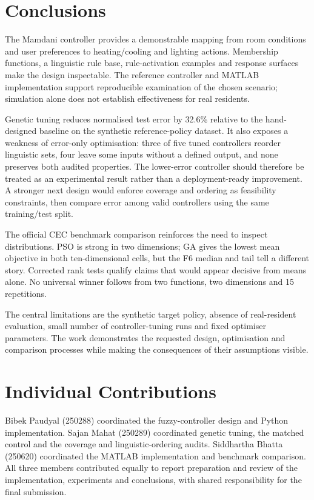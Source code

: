 \section{Conclusions}
\label{sec:t2-conclusion}
The Mamdani controller provides a demonstrable mapping from room conditions and user
preferences to heating/cooling and lighting actions. Membership functions, a linguistic rule
base, rule-activation examples and response surfaces make the design inspectable. The
reference controller and MATLAB implementation support reproducible examination of the
chosen scenario; simulation alone does not establish effectiveness for real residents.

Genetic tuning reduces normalised test error by 32.6\% relative to the hand-designed baseline
on the synthetic reference-policy dataset. It also exposes a weakness of error-only optimisation:
three of five tuned controllers reorder linguistic sets, four leave some inputs without a defined
output, and none preserves both audited properties. The lower-error controller should therefore
be treated as an experimental result rather than a deployment-ready improvement. A stronger
next design would enforce coverage and ordering as feasibility constraints, then compare error
among valid controllers using the same training/test split.

The official CEC benchmark comparison reinforces the need to inspect distributions. PSO is
strong in two dimensions; GA gives the lowest mean objective in both ten-dimensional cells,
but the F6 median and tail tell a different story. Corrected rank tests qualify claims that
would appear decisive from means alone. No universal winner follows from two functions,
two dimensions and 15 repetitions.

The central limitations are the synthetic target policy, absence of real-resident evaluation,
small number of controller-tuning runs and fixed optimiser parameters. The work demonstrates
the requested design, optimisation and comparison processes while making the consequences
of their assumptions visible.

\section*{Individual Contributions}
Bibek Paudyal (250288) coordinated the fuzzy-controller design and Python implementation.
Sajan Mahat (250289) coordinated genetic tuning, the matched control and the coverage and
linguistic-ordering audits. Siddhartha Bhatta (250620) coordinated the MATLAB implementation
and benchmark comparison. All three members contributed equally to report preparation and
review of the implementation, experiments and conclusions, with shared responsibility for
the final submission.
